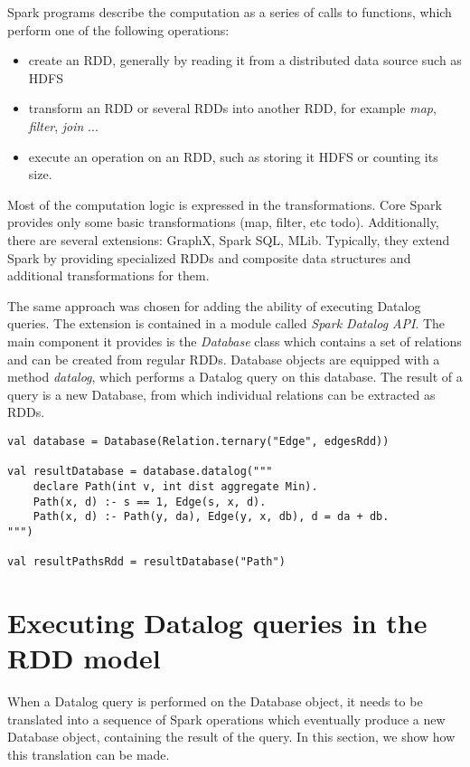 Spark programs describe the computation as a series of calls to functions, which perform one of the following operations:
\begin{itemize}
  \item create an RDD, generally by reading it from a distributed data source such as HDFS
  \item transform an RDD or several RDDs into another RDD, for example \emph{map}, \emph{filter}, \emph{join} ... 
  \item execute an operation on an RDD, such as storing it HDFS or counting its size.
\end{itemize}

Most of the computation logic is expressed in the transformations.  Core Spark provides only some basic transformations (map, filter, etc todo). Additionally, there are several extensions: GraphX, Spark SQL, MLib. Typically, they extend Spark by providing specialized RDDs and composite data structures and additional transformations for them.

The same approach was chosen for adding the ability of executing Datalog queries. The extension is contained in a module called \emph{Spark Datalog API}. The main component it provides is the \emph{Database} class which contains a set of relations and can be created from regular RDDs. Database objects are equipped with a method \emph{datalog}, which performs a Datalog query on this database. The result of a query is a new Database, from which individual relations can be extracted as RDDs. 



\begin{Verbatim}
val database = Database(Relation.ternary("Edge", edgesRdd))

val resultDatabase = database.datalog("""
    declare Path(int v, int dist aggregate Min).
    Path(x, d) :- s == 1, Edge(s, x, d).
    Path(x, d) :- Path(y, da), Edge(y, x, db), d = da + db.
""")
  
val resultPathsRdd = resultDatabase("Path")
\end{Verbatim}

\section{Executing Datalog queries in the RDD model}

When a Datalog query is performed on the Database object, it needs to be translated into a sequence of Spark operations which eventually produce a new Database object, containing the result of the query. In this section, we show how this translation can be made.

